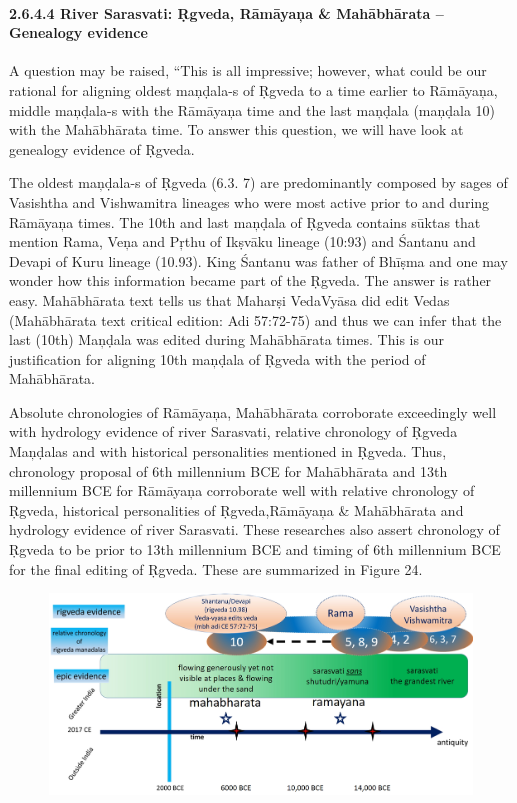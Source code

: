 \paragraph*{2.6.4.4 River Sarasvati: Ṛgveda, Rāmāyaņa \& Mahābhārata – Genealogy evidence}

A question may be raised, “This is all impressive; however, what could be our rational for aligning oldest maņḍala-s of Ṛgveda to a time earlier to Rāmāyaņa, middle maņḍala-s with the Rāmāyaņa time and the last maņḍala (maņḍala 10) with the Mahābhārata time. To answer this question, we will have look at genealogy evidence of Ṛgveda.

The oldest maņḍala-s of Ṛgveda (6.3. 7) are predominantly composed by sages of Vasishtha and Vishwamitra lineages who were most active prior to and during Rāmāyaņa times. The 10th and last maņḍala of Ṛgveda contains sūktas that mention Rama, Veņa and Pŗthu of Ikṣvāku lineage (10:93) and Śantanu and Devapi of Kuru lineage (10.93). King Śantanu was father of Bhīṣma and one may wonder how this information became part of the Ṛgveda. The answer is rather easy. Mahābhārata text tells us that Maharṣi VedaVyāsa did edit Vedas (Mahābhārata text critical edition: Adi 57:72-75) and thus we can infer that the last (10th) Maņḍala was edited during Mahābhārata times. This is our justification for aligning 10th maņḍala of Ṛgveda with the period of Mahābhārata.

Absolute chronologies of Rāmāyaņa, Mahābhārata corroborate exceedingly well with hydrology evidence of river Sarasvati, relative chronology of Ṛgveda Maņḍalas and with historical personalities mentioned in Ṛgveda. Thus, chronology proposal of 6th millennium BCE for Mahābhārata and 13th millennium BCE for Rāmāyaņa corroborate well with relative chronology of Ṛgveda, historical personalities of Ṛgveda,\break Rāmāyaņa \& Mahābhārata and hydrology evidence of river Sarasvati. These researches also assert chronology of Ṛgveda to be prior to 13th millennium BCE and timing of 6th millennium BCE for the final editing of Ṛgveda. These are summarized in Figure 24.

\begin{figure}[!htbp]
\includegraphics[scale=0.205]{images/8-24.jpg}
\caption{}\label{art8-fig24}
\end{figure}



